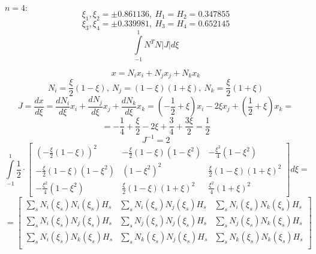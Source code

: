 $n = 4:$
\[
\xi_1, \xi_2 = \pm 0.861136,\ H_1 = H_2 = 0.347855
\]
\[
\xi_3, \xi_4 = \pm 0.339981,\ H_3 = H_4 = 0.652145
\]
\newpage
\[
\int \limits_{-1}^1 N^T N |J| d\xi
\]
\begin{center}
\end{center}
\[
x = N_ix_i + N_j x_j + N_k x_k 
\]
\[
N_i = \frac{\xi}{2} (1 - \xi),\ N_j = (1-\xi)(1+\xi),\ N_k = \frac{\xi}{2} (1 + \xi)
\]
\[
J = \frac{dx}{d\xi} = \frac{dN_i}{d\xi}x_i + \frac{dN_j}{d\xi}x_j + \frac{dN_k}{d\xi}x_k = \left( -\frac{1}{2} + \xi \right) x_i - 2\xi x_j + \left(\frac{1}{2} + \xi \right) x_k =
\]
\[
= -\frac{1}{4} + \frac{\xi}{2} - 2\xi + \frac{3}{4} + \frac{3\xi}{2} = \frac{1}{2}
\]
\[
J^{-1} = 2
\]
\[
\int \limits_{-1}^1 \frac{1}{2} \cdot 
\begin{bmatrix} 
\left(-\frac{\xi}{2} (1 - \xi) \right)^2 & -\frac{\xi}{2} (1-\xi)(1-\xi^2) & -\frac{\xi^2}{4} (1 - \xi^2) \\
-\frac{\xi}{2} (1-\xi)(1-\xi^2) & (1-\xi^2)^2 & \frac{\xi}{2} (1-\xi)(1+\xi)^2 \\
-\frac{\xi^2}{4} (1 - \xi^2) & \frac{\xi}{2} (1-\xi)(1+\xi)^2 & \frac{\xi^2}{4} (1+\xi)^2
\end{bmatrix} d\xi = 
\]
\begin{equation}\label{matrix_form}
= \begin{bmatrix} 
\sum \limits_s N_i (\xi_s) N_i(\xi_s) H_s  & \sum \limits_s N_i (\xi_s) N_j(\xi_s) H_s & \sum \limits_s N_i (\xi_s) N_k(\xi_s) H_s \\
\sum \limits_s N_i (\xi_s) N_j(\xi_s) H_s  & \sum \limits_s N_j (\xi_s) N_j(\xi_s) H_s & \sum \limits_s N_j (\xi_s) N_k(\xi_s) H_s \\
\sum \limits_s N_i (\xi_s) N_k(\xi_s) H_s  & \sum \limits_s N_k (\xi_s) N_j(\xi_s) H_s & \sum \limits_s N_k (\xi_s) N_k(\xi_s) H_s \\
\end{bmatrix}
\end{equation}
